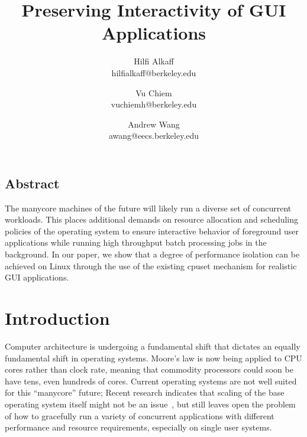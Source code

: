 \documentclass[letterpaper,twocolumn,11pt]{article}
\begin{document}
\date{}

\title{\Large \bf Preserving Interactivity of GUI Applications}

\author{
{\rm Hilfi Alkaff}\\
hilfialkaff@berkeley.edu
\and
{\rm Vu Chiem}\\
vuchiemh@berkeley.edu
\and
{\rm Andrew Wang}\\
awang@eecs.berkeley.edu
} %

\maketitle



\subsection*{Abstract}
The manycore machines of the future will likely run a diverse set of concurrent workloads. This places additional demands on resource allocation and scheduling policies of the operating system to ensure interactive behavior of foreground user applications while running high throughput batch processing jobs in the background. In our paper, we show that a degree of performance isolation can be achieved on Linux through the use of the existing cpuset mechanism for realistic GUI applications.

\section{Introduction}

Computer architecture is undergoing a fundamental shift that dictates an equally fundamental shift in operating systems. Moore's law is now being applied to CPU cores rather than clock rate, meaning that commodity processors could soon be have tens, even hundreds of cores. Current operating systems are not well suited for this ``manycore'' future; Recent research indicates that scaling of the base operating system itself might not be an issue~\cite{linux:osdi10}, but still leaves open the problem of how to gracefully run a variety of concurrent applications with different performance and resource requirements, especially on single user systems.
\end{document}
